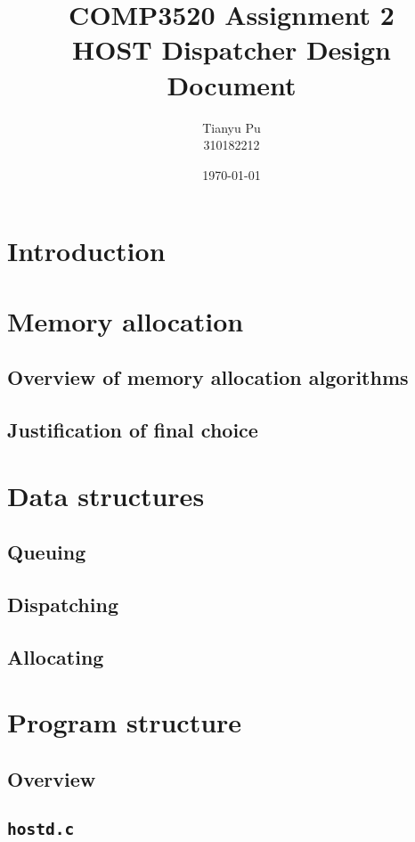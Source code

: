 \documentclass[12pt]{article}
\title{COMP3520 Assignment 2\\
  HOST Dispatcher Design Document}
\author{Tianyu Pu\\
  310182212}
\date{\today}
\begin{document}
\maketitle

\section{Introduction}
\cite{ausmines}

\section{Memory allocation}

\subsection{Overview of memory allocation algorithms}

\subsection{Justification of final choice}

\section{Data structures}

\subsection{Queuing}

\subsection{Dispatching}

\subsection{Allocating}

\section{Program structure}

\subsection{Overview}

\subsection{\tt{hostd.c}}
\end{document}
